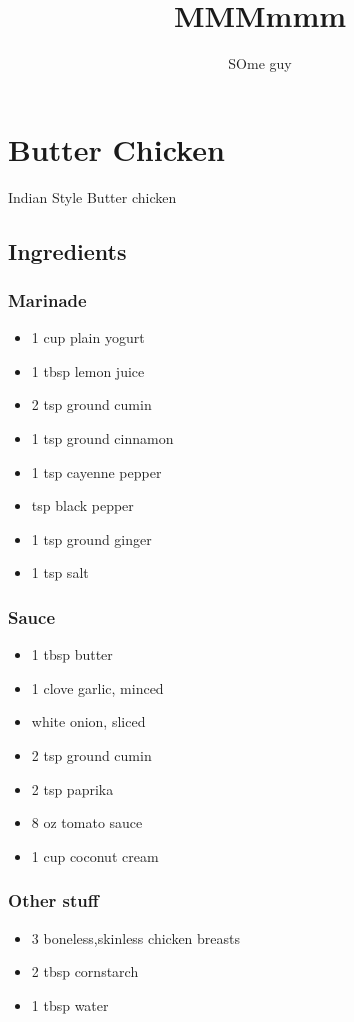 \documentclass{article}
\begin{document}
\title{\vspace{-2.0cm}MMMmmm}
\author{SOme guy}
\maketitle{}


\section{Butter Chicken}
Indian Style Butter chicken
\subsection{Ingredients}
\subsubsection{Marinade}
\begin{itemize}
\item 1 cup plain yogurt
\item 1 tbsp lemon juice
\item 2 tsp ground cumin
\item 1 tsp ground cinnamon
\item 1 tsp cayenne pepper
\item {} tsp black pepper
\item 1 tsp ground ginger
\item 1 tsp salt
\end{itemize}
\subsubsection{Sauce}
\begin{itemize}
\item 1 tbsp butter
\item 1 clove garlic, minced
\item {} white onion, sliced
\item 2 tsp ground cumin
\item 2 tsp paprika
\item 8 oz tomato sauce
\item 1 cup coconut cream
\end{itemize}
\subsubsection{Other stuff}
\begin{itemize}
\item 3 boneless,skinless chicken breasts
\item 2 tbsp cornstarch
\item 1 tbsp water
\end{itemize}
\end{document}
